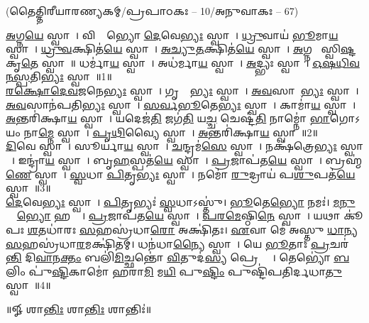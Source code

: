 
\vspace{-1ex}
\centerline{\normalsize (𑌤𑍈𑌤𑍍𑌤𑌿𑌰𑍀𑌯𑌾𑌰𑌣𑍍𑌯𑌕𑌮𑍍/𑌪𑍍𑌰𑌪𑌾𑌠𑌕𑌃 – 10/𑌅𑌨𑍁𑌵𑌾𑌕𑌃 – 67)}
\ul{𑌅}𑌗𑍍𑌨\ul{𑌯𑍇} 𑌸𑍍𑌵𑌾𑌹𑌾᳚। 𑌵𑌿𑌶𑍍𑌵𑍇᳚𑌭𑍍𑌯𑍋 \ul{𑌦𑍇}𑌵𑍇\ul{𑌭𑍍𑌯𑌃} 𑌸𑍍𑌵𑌾𑌹𑌾᳚। \ul{𑌧𑍍𑌰𑍁}𑌵𑌾𑌯॑ \ul{𑌭𑍂}𑌮𑌾\ul{𑌯} 𑌸𑍍𑌵𑌾𑌹𑌾᳚। \ul{𑌧𑍍𑌰𑍁}\ul{𑌵}𑌕𑍍𑌷𑌿𑌤॑\ul{𑌯𑍇} 𑌸𑍍𑌵𑌾𑌹𑌾᳚। \ul{𑌅}\ul{𑌚𑍍𑌯𑍁}\ul{𑌤}𑌕𑍍𑌷𑌿𑌤॑\ul{𑌯𑍇} 𑌸𑍍𑌵𑌾𑌹𑌾᳚। \ul{𑌅}𑌗𑍍𑌨𑌯𑍇᳚ 𑌸𑍍𑌵𑌿\ul{𑌷𑍍𑌟}𑌕𑍃\ul{𑌤𑍇} 𑌸𑍍𑌵𑌾𑌹𑌾᳚॥ 𑌧𑌰𑍍𑌮𑌾॑\ul{𑌯} 𑌸𑍍𑌵𑌾𑌹𑌾᳚। 𑌅𑌧॑𑌰𑍍𑌮𑌾\ul{𑌯} 𑌸𑍍𑌵𑌾𑌹𑌾᳚। \ul{𑌅}𑌦𑍍𑌭𑍍𑌯𑌃 𑌸𑍍𑌵𑌾𑌹𑌾᳚। \ul{𑌓}\ul{𑌷}\ul{𑌧𑌿}\ul{𑌵}\ul{𑌨}\ul{𑌸𑍍𑌪}𑌤𑌿\ul{𑌭𑍍𑌯𑌃} 𑌸𑍍𑌵𑌾𑌹𑌾᳚॥1॥ \\
\ul{𑌰}\ul{𑌕𑍍𑌷𑍋}\ul{𑌦𑍇}\ul{𑌵}\ul{𑌜}𑌨𑍇\ul{𑌭𑍍𑌯𑌃} 𑌸𑍍𑌵𑌾𑌹𑌾᳚। 𑌗𑍃𑌹𑍍𑌯𑌾᳚\ul{𑌭𑍍𑌯𑌃} 𑌸𑍍𑌵𑌾𑌹𑌾᳚। \ul{𑌅}\ul{𑌵}𑌸𑌾𑌨𑍇᳚\ul{𑌭𑍍𑌯𑌃} 𑌸𑍍𑌵𑌾𑌹𑌾᳚। \ul{𑌅}\ul{𑌵}𑌸𑌾𑌨॑𑌪𑌤𑌿\ul{𑌭𑍍𑌯𑌃} 𑌸𑍍𑌵𑌾𑌹𑌾᳚। \ul{𑌸}\ul{𑌰𑍍𑌵}\ul{𑌭𑍂}𑌤𑍇\ul{𑌭𑍍𑌯𑌃} 𑌸𑍍𑌵𑌾𑌹𑌾᳚। 𑌕𑌾𑌮𑌾॑\ul{𑌯} 𑌸𑍍𑌵𑌾𑌹𑌾᳚। \ul{𑌅}𑌨𑍍𑌤𑌰𑌿॑𑌕𑍍𑌷𑌾\ul{𑌯} 𑌸𑍍𑌵𑌾𑌹𑌾᳚। 𑌯𑌦𑍇𑌜॑\ul{𑌤𑌿} 𑌜𑌗॑\ul{𑌤𑌿} 𑌯\ul{𑌚𑍍𑌚} 𑌚𑍇𑌷𑍍𑌟॑\ul{𑌤𑌿} 𑌨𑌾𑌮𑍍𑌨𑍋॑ \ul{𑌭𑌾}𑌗𑍋𑌽𑌯𑌂 𑌨𑌾\ul{𑌮𑍍𑌨𑍇} 𑌸𑍍𑌵𑌾𑌹𑌾᳚। \ul{𑌪𑍃}\ul{𑌥𑌿}𑌵𑍍𑌯𑍈 𑌸𑍍𑌵𑌾𑌹𑌾᳚। \ul{𑌅}𑌨𑍍𑌤𑌰𑌿॑𑌕𑍍𑌷𑌾\ul{𑌯} 𑌸𑍍𑌵𑌾𑌹𑌾᳚॥2॥ \\
\ul{𑌦𑌿}𑌵𑍇 𑌸𑍍𑌵𑌾𑌹𑌾᳚। 𑌸𑍂𑌰𑍍𑌯𑌾॑\ul{𑌯} 𑌸𑍍𑌵𑌾𑌹𑌾᳚। \ul{𑌚}𑌨𑍍𑌦𑍍𑌰𑌮॑\ul{𑌸𑍇} 𑌸𑍍𑌵𑌾𑌹𑌾᳚। 𑌨𑌕𑍍𑌷॑𑌤𑍍𑌰𑍇\ul{𑌭𑍍𑌯𑌃} 𑌸𑍍𑌵𑌾𑌹𑌾᳚। 𑌇𑌨𑍍𑌦𑍍𑌰𑌾॑\ul{𑌯} 𑌸𑍍𑌵𑌾𑌹𑌾᳚। 𑌬𑍃\ul{𑌹}𑌸𑍍𑌪𑌤॑\ul{𑌯𑍇} 𑌸𑍍𑌵𑌾𑌹𑌾᳚। \ul{𑌪𑍍𑌰}𑌜𑌾𑌪॑𑌤\ul{𑌯𑍇} 𑌸𑍍𑌵𑌾𑌹𑌾᳚। 𑌬𑍍𑌰𑌹𑍍𑌮॑\ul{𑌣𑍇} 𑌸𑍍𑌵𑌾𑌹𑌾᳚। \ul{𑌸𑍍𑌵}𑌧𑌾 \ul{𑌪𑌿}𑌤𑍃\ul{𑌭𑍍𑌯𑌃} 𑌸𑍍𑌵𑌾𑌹𑌾᳚। 𑌨𑌮𑍋॑ \ul{𑌰𑍁}𑌦𑍍𑌰𑌾𑌯॑ 𑌪\ul{𑌶𑍁}𑌪𑌤॑\ul{𑌯𑍇} 𑌸𑍍𑌵𑌾𑌹𑌾᳚॥3॥\\
  \ul{𑌦𑍇}𑌵𑍇\ul{𑌭𑍍𑌯𑌃} 𑌸𑍍𑌵𑌾𑌹𑌾᳚। \ul{𑌪𑌿}𑌤𑍃𑌭𑍍𑌯𑌃॑ \ul{𑌸𑍍𑌵}𑌧𑌾𑌽𑌸𑍍𑌤𑍁॑। \ul{𑌭𑍂}𑌤𑍇\ul{𑌭𑍍𑌯𑍋} 𑌨𑌮𑌃॑। \ul{𑌮}\ul{𑌨𑍁}𑌷𑍍𑌯𑍇᳚\ul{𑌭𑍍𑌯𑍋} 𑌹𑌨𑍍𑌤𑌾᳚। \ul{𑌪𑍍𑌰}𑌜𑌾𑌪॑𑌤\ul{𑌯𑍇} 𑌸𑍍𑌵𑌾𑌹𑌾᳚। \ul{𑌪}\ul{𑌰}\ul{𑌮𑍇}𑌷𑍍𑌠𑌿\ul{𑌨𑍇} 𑌸𑍍𑌵𑌾𑌹𑌾᳚। 𑌯𑌥𑌾 𑌕𑍂॑𑌪𑌃 \ul{𑌶}𑌤𑌧𑌾॑𑌰𑌃 \ul{𑌸}𑌹𑌸𑍍𑌰॑𑌧𑌾\ul{𑌰𑍋} 𑌅𑌕𑍍𑌷𑌿॑𑌤𑌃। \ul{𑌏}𑌵𑌾 𑌮𑍇॑ 𑌅𑌸𑍍𑌤𑍁 \ul{𑌧𑌾}𑌨𑍍𑌯 \ul{𑌸}𑌹𑌸𑍍𑌰॑𑌧𑌾\ul{𑌰}𑌮𑌕𑍍𑌷𑌿॑𑌤𑌮𑍍। 𑌧𑌨॑𑌧𑌾\ul{𑌨𑍍𑌯𑍈} 𑌸𑍍𑌵𑌾𑌹𑌾᳚। 𑌯𑍇 \ul{𑌭𑍂}𑌤𑌾𑌃 \ul{𑌪𑍍𑌰}𑌚𑌰॑\ul{𑌨𑍍𑌤𑌿} 𑌦𑌿\ul{𑌵𑌾}𑌨\ul{𑌕𑍍𑌤𑌂} 𑌬𑌲𑌿॑\ul{𑌮𑌿}𑌚𑍍𑌛𑌨𑍍𑌤𑍋॑ \ul{𑌵𑌿}𑌤𑍁𑌦॑\ul{𑌸𑍍𑌯} 𑌪𑍍𑌰𑍇𑌷𑍍𑌯𑌾𑌃᳚। 𑌤𑍇𑌭𑍍𑌯𑍋॑ \ul{𑌬}𑌲𑌿𑌂 𑌪𑍁॑\ul{𑌷𑍍𑌟𑌿}𑌕𑌾𑌮𑍋॑ 𑌹𑌰𑌾\ul{𑌮𑌿} 𑌮\ul{𑌯𑌿} 𑌪𑍁\ul{𑌷𑍍𑌟𑌿𑌂} 𑌪𑍁𑌷𑍍𑌟𑌿॑𑌪𑌤𑌿𑌰𑍍𑌦𑌧𑌾\ul{𑌤𑍁} 𑌸𑍍𑌵𑌾𑌹𑌾᳚॥4॥ 

\centerline{॥𑍐 𑌶𑌾\ul{𑌨𑍍𑌤𑌿𑌃} 𑌶𑌾\ul{𑌨𑍍𑌤𑌿𑌃} 𑌶𑌾𑌨𑍍𑌤𑌿𑌃॑॥}

